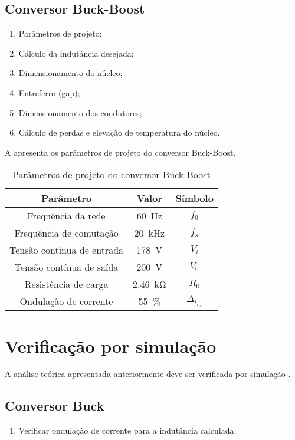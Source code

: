\subsection{Conversor Buck-Boost}
\begin{enumerate}	
	\item Parâmetros de projeto; 	
	\item Cálculo da indutância desejada;	
	\item Dimensionamento do núcleo;	
	\item Entreferro (gap);
	\item  Dimensionamento dos condutores;
	\item Cálculo de perdas e elevação de temperatura do núcleo.
\end{enumerate}

A  apresenta os parâmetros de projeto do conversor Buck-Boost.
\begin{table}[!ht]
	\centering
	\caption{Parâmetros de projeto do conversor Buck-Boost}
	\label{tab:parametrosBuckBoost}
	\begin{tabular}{@{}ccc@{}}
		\toprule
		\textbf{Parâmetro} & \textbf{Valor} & \textbf{Símbolo} \\ \midrule			
		Frequência  da rede        & \SI{60}{\hertz}     & $f_0$  \\		
		Frequência de comutação        & \SI{20}{\kilo\hertz}     & $f_s$  \\	
		Tensão contínua de entrada         &  \SI{178}{\V}      & $V_i$  \\
		Tensão contínua de saída         &  \SI{200}{\V}      & $V_0$  \\
		Resistência de carga        & \SI{2.46}{\kilo\ohm}      & $R_0$  \\
		Ondulação de corrente       & \SI{55}{\%}    & $\Delta_{i_{L_0}}$    \\  \bottomrule	
	\end{tabular}
\end{table}

\section{Verificação por simulação}


A análise teórica apresentada anteriormente deve ser verificada por simulação \cite{noauthor_psim_nodate}. 
 
\subsection{Conversor Buck}
\begin{enumerate}	
	\item Verificar ondulação de corrente para a indutância calculada; 	
\end{enumerate}


